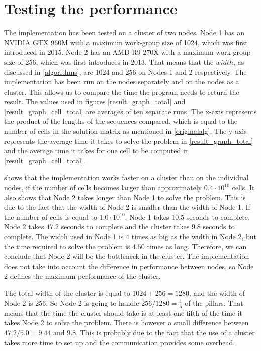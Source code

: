 \section{Testing the performance} \label{testing}
The implementation has been tested on a cluster of two nodes.
Node 1 has an NVIDIA GTX 960M with a maximum work-group size of 1024, which was first introduced in 2015.
Node 2 has an AMD R9 270X with a maximum work-group size of 256, which was first introduces in 2013.
That means that the $width$, as discussed in \cref{algorithms}, are 1024 and 256 on Nodes 1 and 2 respectively.
The implementation has been run on the nodes separately and on the nodes as a cluster.
This allows us to compare the time the program needs to return the result.
The values used in figures \ref{result_graph_total} and \ref{result_graph_cell_total} are averages of ten separate runs.
The x-axis represents the product of the lengths of the sequences compared, which is equal to the number of cells in the solution matrix as mentioned in \cref{originalalg}.
The y-axis represents the average time it takes to solve the problem in \cref{result_graph_total} and the average time it takes for one cell to be computed in \cref{result_graph_cell_total}.

 shows that the implementation works faster on a cluster than on the individual nodes, if the number of cells becomes larger than approximately $0.4 \cdot 10^{10}$ cells.
It also shows that Node 2 takes longer than Node 1 to solve the problem.
This is due to the fact that the width of Node 2 is smaller than the width of Node 1.
If the number of cells is equal to $1.0 \cdot 10^{10}$, Node 1 takes $10.5$ seconds to complete, Node 2 takes $47.2$ seconds to complete and the cluster takes $9.8$ seconds to complete.
The width used in Node 1 is $4$ times as big as the width in Node 2, but the time required to solve the problem is $4.50$ times as long.
Therefore, we can conclude that Node 2 will be the bottleneck in the cluster.
The implementation does not take into account the difference in performance between nodes, so Node 2 defines the maximum performance of the cluster.

The total width of the cluster is equal to $1024 + 256 = 1280$, and the width of Node 2 is 256.
So Node 2 is going to handle $256 / 1280 = \frac{1}{5}$ of the pillars.
That means that the time the cluster should take is at least one fifth of the time it takes Node 2 to solve the problem.
There is however a small difference between $47.2 / 5.0 = 9.44$ and $9.8$.
This is probably due to the fact that the use of a cluster takes more time to set up and the communication provides some overhead.

